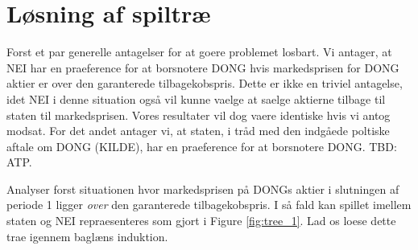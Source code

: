 \documentclass{article}
\begin{document}
\newpage

\appendix

\FloatBarrier

\section{Løsning af spiltræ}
\label{sec:app_tree}
Forst et par generelle antagelser for at goere problemet losbart. Vi antager, at NEI har en praeference for at borsnotere DONG hvis markedsprisen for DONG aktier er over den garanterede tilbagekobspris. Dette er ikke en triviel antagelse, idet NEI i denne situation også vil kunne vaelge at saelge aktierne tilbage til staten til markedsprisen. Vores resultater vil dog vaere identiske hvis vi antog modsat. For det andet antager vi, at staten, i tråd med den indgåede poltiske aftale om DONG (KILDE), har en praeference for at borsnotere DONG. TBD: ATP.

Analyser forst situationen hvor markedsprisen på DONGs aktier i slutningen af periode 1 ligger \textit{over} den garanterede tilbagekobspris. I så fald kan spillet imellem staten og NEI repraesenteres som gjort i Figure \ref{fig:tree_1}. Lad os loese dette trae igennem baglæns induktion.  
\end{document}
